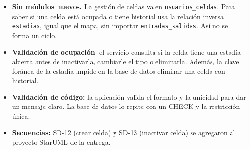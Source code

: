 \begin{itemize}
  \item \textbf{Sin módulos nuevos.} La gestión de celdas va en \texttt{usuarios\_celdas}. Para saber si una celda está ocupada o tiene historial usa la relación inversa \texttt{estadias}, igual que el mapa, sin importar \texttt{entradas\_salidas}. Así no se forma un ciclo.
  \item \textbf{Validación de ocupación:} el servicio consulta si la celda tiene una estadía abierta antes de inactivarla, cambiarle el tipo o eliminarla. Además, la clave foránea de la estadía impide en la base de datos eliminar una celda con historial.
  \item \textbf{Validación de código:} la aplicación valida el formato y la unicidad para dar un mensaje claro. La base de datos lo repite con un CHECK y la restricción única.
  \item \textbf{Secuencias:} SD-12 (crear celda) y SD-13 (inactivar celda) se agregaron al proyecto StarUML de la entrega.
\end{itemize}


